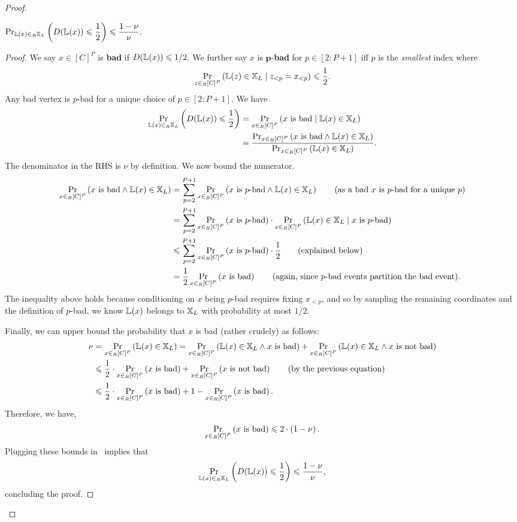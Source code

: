 \begin{proof}
\begin{claim}\label{clm:2}
	$
		\operatorname*{\textnormal{Pr}}_{\mathbb{L}(x) \in_R \mathbb{X}_L}\left(D(\mathbb{L}(x)) \leqslant \dfrac12\right) \leqslant \dfrac{1-\nu}{\nu}. 
	$
\end{claim}
\begin{proof}
	We say $x \in [C]^P$ is \textbf{bad} if $D(\mathbb{L}(x)) \leqslant 1/2$. We further say $x$ is $\bm{p}$-\textbf{bad} for $p \in [2:P+1]$ iff $p$ is the \emph{smallest} index where
	\[
		\operatorname*{\textnormal{Pr}}_{z \in_R [C]^P}\left(\mathbb{L}(z) \in \mathbb{X}_L \mid z_{<p}=x_{<p}\right) \leqslant \frac 12. 
	\]
	Any bad vertex is $p$-bad for a unique choice of $p \in [2:P+1]$. We have 
	\begin{align}
		\operatorname*{\textnormal{Pr}}_{\mathbb{L}(x) \in_R \mathbb{X}_L}\left(D(\mathbb{L}(x)) \leqslant \frac12\right) &= \operatorname*{\textnormal{Pr}}_{x \in_R [C]^P}\left(\text{$x$ is bad} \mid \mathbb{L}(x) \in \mathbb{X}_L\right) \notag \\
		&= \frac{\operatorname*{\textnormal{Pr}}_{x \in_R [C]^P}\left(\text{$x$ is bad} \wedge \mathbb{L}(x) \in \mathbb{X}_L\right)}{\operatorname*{\textnormal{Pr}}_{x \in_R [C]^P}\left(\mathbb{L}(x) \in \mathbb{X}_L\right)}. \label{eq:clm2}
	\end{align}
	The denominator in the RHS is $\nu$ by definition. We now bound the numerator. 
	\begin{align*}
		\operatorname*{\textnormal{Pr}}_{x \in_R [C]^P}\left(\text{$x$ is bad} \wedge \mathbb{L}(x) \in \mathbb{X}_L\right) &= \sum_{p=2}^{P+1} \operatorname*{\textnormal{Pr}}_{x \in_R [C]^P}\left(\text{$x$ is $p$-bad} \wedge \mathbb{L}(x) \in \mathbb{X}_L\right) \tag{as a bad $x$ is $p$-bad for a unique $p$} \\
		&= \sum_{p=2}^{P+1} \operatorname*{\textnormal{Pr}}_{x \in_R [C]^P}\left(\text{$x$ is $p$-bad}\right) \cdot \operatorname*{\textnormal{Pr}}_{x \in_R [C]^P}\left(\mathbb{L}(x) \in \mathbb{X}_L \mid \text{$x$ is $p$-bad}\right) \\
		&\leqslant \sum_{p=2}^{P+1} \operatorname*{\textnormal{Pr}}_{x \in_R [C]^P}\left(\text{$x$ is $p$-bad}\right) \cdot \frac12 \tag{explained below} \\
		&= \frac{1}{2} \operatorname*{\textnormal{Pr}}_{x \in_R [C]^P}\left(\text{$x$ is bad}\right) \tag{again, since $p$-bad events partition the bad event}. 
	\end{align*}
	The inequality above holds because conditioning on $x$ being $p$-bad requires fixing $x_{<p}$, and so by sampling the remaining coordinates and the definition of $p$-bad, we know $\mathbb{L}(x)$ belongs to $\mathbb{X}_L$ with probability at most $1/2$. 
	
	Finally, we can upper bound the probability that $x$ is bad (rather crudely) as follows: 
	\begin{align*}
		\nu &= \operatorname*{\textnormal{Pr}}_{x \in_R [C]^P}\left(\mathbb{L}(x) \in \mathbb{X}_L\right) = \operatorname*{\textnormal{Pr}}_{x \in_R [C]^P}\left(\mathbb{L}(x) \in \mathbb{X}_L \wedge \text{$x$ is bad}\right) + \operatorname*{\textnormal{Pr}}_{x \in_R [C]^P}\left(\mathbb{L}(x) \in \mathbb{X}_L \wedge \text{$x$ is not bad}\right) \\
		&\leqslant \frac12 \cdot \operatorname*{\textnormal{Pr}}_{x \in_R [C]^P}\left(\text{$x$ is bad}\right) + \operatorname*{\textnormal{Pr}}_{x \in_R [C]^P}\left(\text{$x$ is not bad}\right) \tag{by the previous equation} \\
		&\leqslant \frac12 \cdot \operatorname*{\textnormal{Pr}}_{x \in_R [C]^P}\left(\text{$x$ is bad}\right) + 1 - \operatorname*{\textnormal{Pr}}_{x \in_R [C]^P}\left(\text{$x$ is bad}\right).
	\end{align*}
	Therefore, we have, 
	\[
		\operatorname*{\textnormal{Pr}}_{x \in_R [C]^P}\left(\text{$x$ is bad}\right) \leqslant 2 \cdot \left(1-\nu\right). 
	\]
	Plugging these bounds in~ implies that 
	\[
		\operatorname*{\textnormal{Pr}}_{\mathbb{L}(x) \in_R \mathbb{X}_L}\left(D(\mathbb{L}(x)) \leqslant \frac12\right) \leqslant \frac{1-\nu}{\nu}, 
	\]
	concluding the proof. 
	

\end{proof}
\end{proof}
